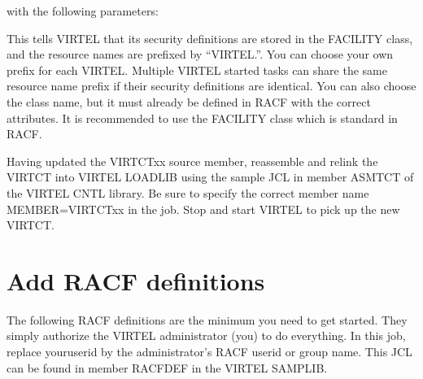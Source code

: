 \documentclass[letterpaper,10pt,english]{sphinxmanual}
\begin{document}
with the following parameters:

\begin{sphinxVerbatim}[commandchars=\\\{\}]
\end{sphinxVerbatim}

This tells VIRTEL that its security definitions are stored in the FACILITY class, and the resource names are prefixed by “VIRTEL.”. You can choose your own prefix for each VIRTEL. Multiple VIRTEL started tasks can share the same resource name prefix if their security definitions are identical. You can also choose the class name, but it must already be defined in RACF with the correct attributes. It is recommended to use the FACILITY class which is standard in RACF.

Having updated the VIRTCTxx source member, reassemble and relink the VIRTCT into VIRTEL LOADLIB using the sample JCL in member ASMTCT of the VIRTEL CNTL library. Be sure to specify the correct member name MEMBER=VIRTCTxx in the job. Stop and start VIRTEL to pick up the new VIRTCT.

\newpage


\section{Add RACF definitions}
\label{\detokenize{Installation_Guide:index-179}}\label{\detokenize{Installation_Guide:add-racf-definitions}}
The following RACF definitions are the minimum you need to get started. They simply authorize the VIRTEL administrator (you) to do everything. In this job, replace youruserid by the administrator’s RACF userid or group name. This JCL can be found in member RACFDEF in the VIRTEL SAMPLIB.
\end{document}
